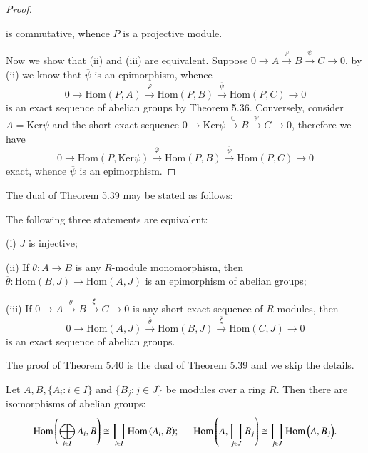 \begin{proof}
\begin{center}
\begin{tikzpicture}[x=0.75pt,y=0.75pt,yscale=-1,xscale=1]
\end{tikzpicture}
\end{center}
is commutative, whence $P$ is a projective module.\par
Now we show that (ii) and (iii) are equivalent. Suppose $0\longrightarrow A\overset{\varphi}{\longrightarrow}B\overset{\psi}{\longrightarrow}C\longrightarrow 0$, by (ii) we know that $\overline{\psi}$ is an epimorphism, whence 
$$
0\longrightarrow \mathrm{Hom}\left( P,A \right) \overset{\overline{\varphi }}{\longrightarrow}\mathrm{Hom}\left( P,B \right) \overset{\overline{\psi }}{\longrightarrow}\mathrm{Hom}\left( P,C \right) \longrightarrow 0
$$
is an exact sequence of abelian groups by Theorem 5.36. Conversely, consider $A=\mathrm{Ker}\psi$ and the short exact sequence $0\longrightarrow \mathrm{Ker}\psi \overset{\subset}{\longrightarrow}B\overset{\psi}{\longrightarrow}C\longrightarrow 0$, therefore we have 
$$
0\longrightarrow \mathrm{Hom}\left( P,\mathrm{Ker}\psi \right) \overset{\overline{\varphi }}{\longrightarrow}\mathrm{Hom}\left( P,B \right) \overset{\overline{\psi }}{\longrightarrow}\mathrm{Hom}\left( P,C \right) \longrightarrow 0
$$
exact, whence $\overline{\psi}$ is an epimorphism.
\end{proof}
The dual of Theorem 5.39 may be stated as follows: 
\begin{theorem}
The following three statements are equivalent:\par
(i) $J$ is injective;\par
(ii) If $\theta:A\to B$ is any $R$-module monomorphism, then $\overline{\theta}:\mathrm{Hom}(B,J)\to\mathrm{Hom}(A,J)$ is an epimorphism of abelian groups;\par
(iii) If $0\longrightarrow A\overset{\theta}{\longrightarrow}B\overset{\xi}{\longrightarrow}C\longrightarrow 0$ is any short exact sequence of $R$-modules, then 
$$
0\longrightarrow \mathrm{Hom}\left( A,J \right) \overset{\overline{\theta }}{\longrightarrow}\mathrm{Hom}\left( B,J \right) \overset{\overline{\xi }}{\longrightarrow}\mathrm{Hom}\left( C,J \right) \longrightarrow 0
$$
is an exact sequence of abelian groups.
\end{theorem}
The proof of Theorem 5.40 is the dual of Theorem 5.39 and we skip the details.
\begin{theorem}
Let $A,B,\{A_i:i\in I\}$ and $\{B_j:j\in J\}$ be modules over a ring $R$. Then there are isomorphisms of abelian groups:
$$
\mathrm{Hom}\left( \bigoplus_{i\in I}{A_i},B \right) \cong \prod_{i\in I}{\mathrm{Hom}\left( A_i,B \right)};\hspace{0.5cm}\mathrm{Hom}\left( A,\prod_{j\in J}{B_j} \right) \cong \prod_{j\in J}{\mathrm{Hom}\left( A,B_j \right)}.
$$
\end{theorem}
